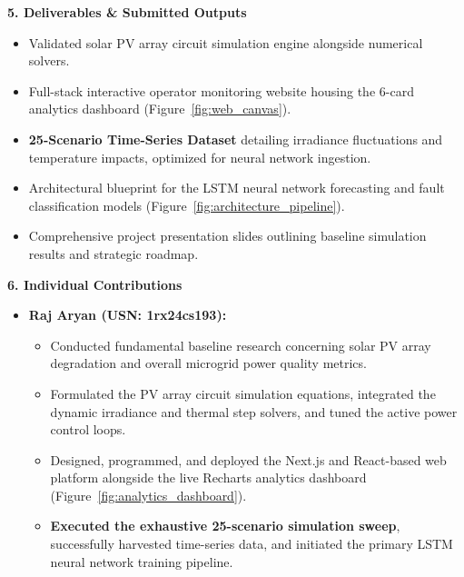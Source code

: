 \documentclass[11pt,a4paper]{article}
\newcommand{\sectionheader}[1]{\vspace{10pt}\noindent\Large\textbf{#1}\vspace{4pt}\normalsize}
\begin{document}
\sectionheader{5. Deliverables \& Submitted Outputs}
\begin{itemize}
    \item Validated solar PV array circuit simulation engine alongside numerical solvers.
    \item Full-stack interactive operator monitoring website housing the 6-card analytics dashboard (Figure~\ref{fig:web_canvas}).
    \item \textbf{25-Scenario Time-Series Dataset} detailing irradiance fluctuations and temperature impacts, optimized for neural network ingestion.
    \item Architectural blueprint for the LSTM neural network forecasting and fault classification models (Figure~\ref{fig:architecture_pipeline}).
    \item Comprehensive project presentation slides outlining baseline simulation results and strategic roadmap.
\end{itemize}

\sectionheader{6. Individual Contributions}
\begin{itemize}
    \item \textbf{Raj Aryan (USN: 1rx24cs193):} 
    \begin{itemize}
        \item Conducted fundamental baseline research concerning solar PV array degradation and overall microgrid power quality metrics.
        \item Formulated the PV array circuit simulation equations, integrated the dynamic irradiance and thermal step solvers, and tuned the active power control loops.
        \item Designed, programmed, and deployed the Next.js and React-based web platform alongside the live Recharts analytics dashboard (Figure~\ref{fig:analytics_dashboard}).
        \item \textbf{Executed the exhaustive 25-scenario simulation sweep}, successfully harvested time-series data, and initiated the primary LSTM neural network training pipeline.
    \end{itemize}
\end{itemize}
\end{document}
